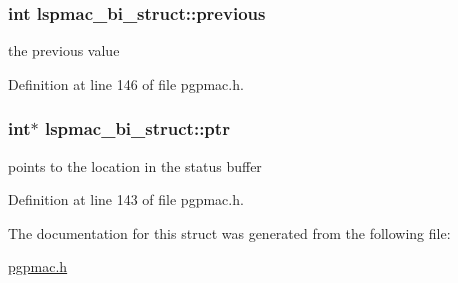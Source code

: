 \hypertarget{structlspmac__bi__struct_a00f09cb3d7bdbe1058fb56bb8c2b0fa3}{
\subsubsection[{previous}]{\setlength{\rightskip}{0pt plus 5cm}int lspmac\-\_\-bi\-\_\-struct\-::previous}}\label{structlspmac__bi__struct_a00f09cb3d7bdbe1058fb56bb8c2b0fa3}


the previous value 



Definition at line 146 of file pgpmac.\-h.

\hypertarget{structlspmac__bi__struct_ae201bf05130bcb6985704ea42efabeb3}{
\subsubsection[{ptr}]{\setlength{\rightskip}{0pt plus 5cm}int$\ast$ lspmac\-\_\-bi\-\_\-struct\-::ptr}}\label{structlspmac__bi__struct_ae201bf05130bcb6985704ea42efabeb3}


points to the location in the status buffer 



Definition at line 143 of file pgpmac.\-h.



The documentation for this struct was generated from the following file\-:\begin{DoxyCompactItemize}
\item 
\hyperlink{pgpmac_8h}{pgpmac.\-h}\end{DoxyCompactItemize}
